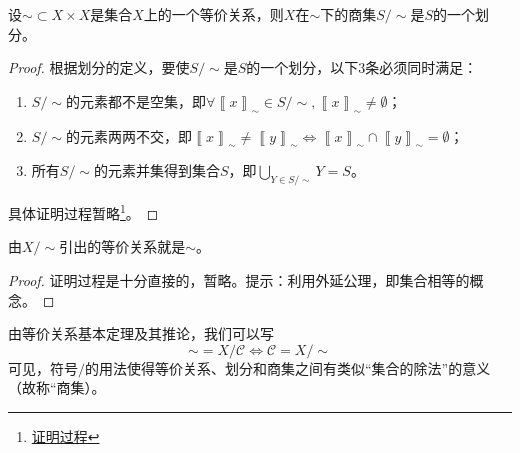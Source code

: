 \documentclass[../main.tex]{subfiles}
\begin{document}
\begin{theorem}[等价关系基本定理]
    设$\sim\subset X\times X$是集合$X$上的一个等价关系，则$X$在$\sim$下的商集$S/\sim$是$S$的一个划分。
\end{theorem}
\begin{proof}
    根据划分的定义，要使$S/\sim$是$S$的一个划分，以下3条必须同时满足：
    \begin{enumerate}
        \item $S/\sim$的元素都不是空集，即$\forall\left\llbracket x\right\rrbracket_\sim\in S/\sim,\left\llbracket x\right\rrbracket_\sim\neq\emptyset$；
        \item $S/\sim$的元素两两不交，即$\left\llbracket x\right\rrbracket_\sim\neq\left\llbracket y\right\rrbracket_\sim\Leftrightarrow\left\llbracket x\right\rrbracket_\sim\cap\left\llbracket y\right\rrbracket_\sim=\emptyset$；
        \item 所有$S/\sim$的元素并集得到集合$S$，即$\bigcup_{Y\in S/\sim}Y=S$。
    \end{enumerate}
    具体证明过程暂略\footnote{\href{https://proofwiki.org/wiki/Fundamental_Theorem_on_Equivalence_Relations}{证明过程}}。
\end{proof}
\begin{corollary}
    由$X/\sim$引出的等价关系就是$\sim$。
\end{corollary}
\begin{proof}
    证明过程是十分直接的，暂略。提示：利用外延公理，即集合相等的概念。
\end{proof}

由等价关系基本定理及其推论，我们可以写
\[
    \sim=X/\mathcal{C}\Leftrightarrow \mathcal{C}=X/\sim
\]
可见，符号$/$的用法使得等价关系、划分和商集之间有类似“集合的除法”的意义（故称“商集）。
\end{document}
